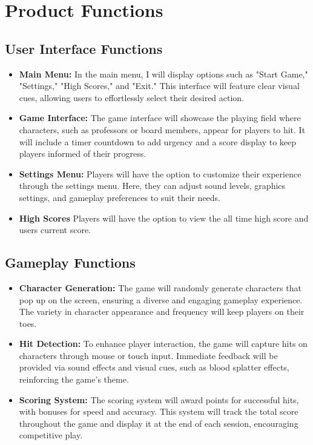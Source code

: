 \documentclass{article}
\begin{document}
\newpage
\section{Product Functions}
\subsection{User Interface Functions}
\begin{itemize}
    \item \textbf{Main Menu:} In the main menu, I will display options such as "Start Game," "Settings," "High Scores," and "Exit." This interface will feature clear visual cues, allowing users to effortlessly select their desired action.
    \item \textbf{Game Interface:} The game interface will showcase the playing field where characters, such as professors or board members, appear for players to hit. It will include a timer countdown to add urgency and a score display to keep players informed of their progress.
    \item \textbf{Settings Menu:} Players will have the option to customize their experience through the settings menu. Here, they can adjust sound levels, graphics settings, and gameplay preferences to suit their needs.
    \item \textbf{High Scores} Players will have the option to view the all time high score and users current score.
\end{itemize}

\subsection{Gameplay Functions}
\begin{itemize}
    \item \textbf{Character Generation:} The game will randomly generate characters that pop up on the screen, ensuring a diverse and engaging gameplay experience. The variety in character appearance and frequency will keep players on their toes.
    \item \textbf{Hit Detection:} To enhance player interaction, the game will capture hits on characters through mouse or touch input. Immediate feedback will be provided via sound effects and visual cues, such as blood splatter effects, reinforcing the game's theme.
    \item \textbf{Scoring System:} The scoring system will award points for successful hits, with bonuses for speed and accuracy. This system will track the total score throughout the game and display it at the end of each session, encouraging competitive play.
\end{itemize}
\end{document}
